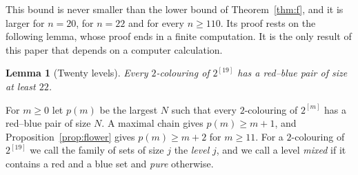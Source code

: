 \documentclass[11pt,reqno]{amsart}
\numberwithin{equation}{section}
\theoremstyle{plain}
\newtheorem{lemma}[theorem]{Lemma}
\theoremstyle{definition}
\theoremstyle{remark}
\begin{document}
This bound is never smaller than the lower bound of Theorem~\ref{thm:f},
and it is larger for $n=20$, for $n=22$ and for every $n\ge110$. Its proof
rests on the following lemma, whose proof ends in a finite computation.
It is the only result of this paper that depends on a computer
calculation.

\begin{lemma}[Twenty levels]
\label{lem:window20}
Every $2$-colouring of $2^{[19]}$ has a red--blue pair of size at least
$22$.
\end{lemma}

For $m\ge0$ let $p(m)$ be the largest $N$ such that every $2$-colouring
of $2^{[m]}$ has a red--blue pair of size $N$. A maximal chain gives
$p(m)\ge m+1$, and Proposition~\ref{prop:flower} gives $p(m)\ge m+2$ for
$m\ge11$. For a $2$-colouring of $2^{[19]}$ we call the family of sets of
size $j$ the \emph{level} $j$, and we call a level \emph{mixed} if it
contains a red and a blue set and \emph{pure} otherwise.
\end{document}
